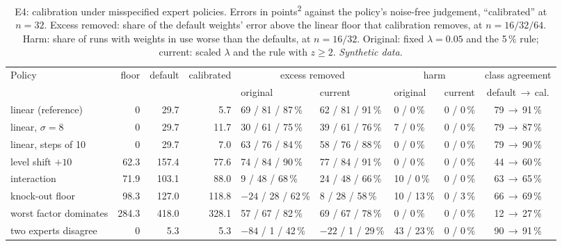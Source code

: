 \documentclass[10pt,twocolumn,a4paper]{article}
\newcommand{\synth}{\textit{Synthetic data.}}
\newcommand{\ptsq}{points\textsuperscript{2}}
\begin{document}
\begin{table}[t]
  \caption{E4: calibration under misspecified expert policies. Errors in \ptsq{} against
  the policy's noise-free judgement, ``calibrated'' at $n=32$. Excess removed: share of
  the default weights' error above the linear floor that calibration removes, at
  $n=16/32/64$. Harm: share of runs with weights in use worse than the defaults, at
  $n=16/32$. Original: fixed $\lambda=0.05$ and the 5\,\% rule; current: scaled
  $\lambda$ and the rule with $z\geq2$. \synth}
  \label{tab:e4}
  \footnotesize
  \setlength{\tabcolsep}{4.5pt}
  \begin{tabular}{@{}lrrrllllc@{}}
    \toprule
    Policy & floor & default & calibrated & \multicolumn{2}{c}{excess removed} & \multicolumn{2}{c}{harm} & class agreement \\
    \cmidrule(lr){5-6}\cmidrule(lr){7-8}
     & & & & original & current & original & current & default\,$\rightarrow$\,cal. \\
    \midrule
    linear (reference) & 0 & 29.7 & 5.7 & 69 / 81 / 87\,\% & 62 / 81 / 91\,\% & 0 / 0\,\% & 0 / 0\,\% & 79\,$\rightarrow$\,91\,\% \\
    linear, $\sigma=8$ & 0 & 29.7 & 11.7 & 30 / 61 / 75\,\% & 39 / 61 / 76\,\% & 7 / 0\,\% & 0 / 0\,\% & 79\,$\rightarrow$\,87\,\% \\
    linear, steps of 10 & 0 & 29.7 & 7.0 & 63 / 76 / 84\,\% & 58 / 76 / 88\,\% & 0 / 0\,\% & 0 / 0\,\% & 79\,$\rightarrow$\,90\,\% \\
    level shift $+10$ & 62.3 & 157.4 & 77.6 & 74 / 84 / 90\,\% & 77 / 84 / 91\,\% & 0 / 0\,\% & 0 / 0\,\% & 44\,$\rightarrow$\,60\,\% \\
    interaction & 71.9 & 103.1 & 88.0 & 9 / 48 / 68\,\% & 24 / 48 / 66\,\% & 10 / 0\,\% & 0 / 0\,\% & 63\,$\rightarrow$\,65\,\% \\
    knock-out floor & 98.3 & 127.0 & 118.8 & $-24$ / 28 / 62\,\% & 8 / 28 / 58\,\% & 10 / 13\,\% & 0 / 3\,\% & 66\,$\rightarrow$\,69\,\% \\
    worst factor dominates & 284.3 & 418.0 & 328.1 & 57 / 67 / 82\,\% & 69 / 67 / 78\,\% & 0 / 0\,\% & 0 / 0\,\% & 12\,$\rightarrow$\,27\,\% \\
    two experts disagree & 0 & 5.3 & 5.3 & $-84$ / 1 / 42\,\% & $-22$ / 1 / 29\,\% & 43 / 23\,\% & 0 / 0\,\% & 90\,$\rightarrow$\,91\,\% \\
    \bottomrule
  \end{tabular}
\end{table}
\end{document}
